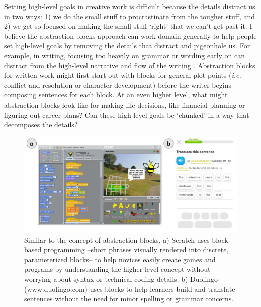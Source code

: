 Setting high-level goals in creative work is difficult because the details distract us in two ways: 1) we do the small stuff to procrastinate from the tougher stuff, and 2) we get so focused on making the small stuff `right' that we can't get past it. I believe the abstraction blocks approach can work domain-generally to help people set high-level goals by removing the details that distract and pigeonhole us.
For example, in writing, focusing too heavily on grammar or wording early on can distract from the high-level narrative and flow of the writing \cite{sommers1980revision}. Abstraction blocks for written work might first start out with blocks for general plot points (\textit{i.e.} conflict and resolution or character development) before the writer begins composing sentences for each block. At an even higher level, what might abstraction blocks look like for making life decisions, like financial planning or figuring out career plans? Can these high-level goals be `chunked' in a way that decomposes the details?

\begin{figure}
\centering
  \includegraphics[width=\textwidth]{i_figures/blocks.jpg}
  \caption[Similar to the concept of abstraction blocks, Scratch \cite{Resnick2009} uses block-based programming --short phrases visually rendered into discrete, parameterized blocks-- to help novices easily create games and programs]{Similar to the concept of abstraction blocks, a) Scratch \cite{Resnick2009} uses block-based programming --short phrases visually rendered into discrete, parameterized blocks-- to help novices easily create games and programs by understanding the higher-level concept without worrying about syntax or technical coding details. b) Duolingo \cite{von2013duolingo}(www.duolingo.com) uses blocks to help learners build and translate sentences without the need for minor spelling or grammar concerns.
}
  \label{fig:scratch}
\end{figure}

